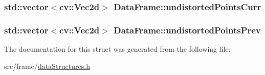 \subsubsection[{\texorpdfstring{undistorted\+Points\+Curr}{undistortedPointsCurr}}]{\setlength{\rightskip}{0pt plus 5cm}std\+::vector$<$cv\+::\+Vec2d$>$ Data\+Frame\+::undistorted\+Points\+Curr}\hypertarget{structDataFrame_a47ffc5d8bf594c79163db6c764dc0705}{}\label{structDataFrame_a47ffc5d8bf594c79163db6c764dc0705}
\subsubsection[{\texorpdfstring{undistorted\+Points\+Prev}{undistortedPointsPrev}}]{\setlength{\rightskip}{0pt plus 5cm}std\+::vector$<$cv\+::\+Vec2d$>$ Data\+Frame\+::undistorted\+Points\+Prev}\hypertarget{structDataFrame_a3725f099035634c1ece2fbdb4dd97256}{}\label{structDataFrame_a3725f099035634c1ece2fbdb4dd97256}


The documentation for this struct was generated from the following file\+:\begin{DoxyCompactItemize}
\item 
src/frame/\hyperlink{dataStructures_8h}{data\+Structures.\+h}\end{DoxyCompactItemize}
